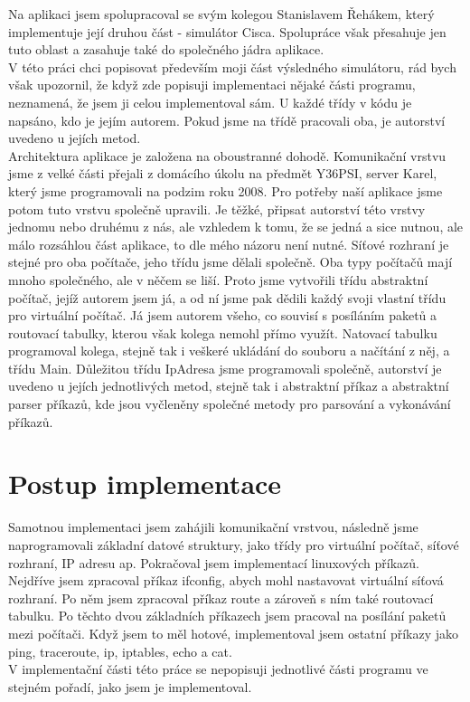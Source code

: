 Na aplikaci jsem spolupracoval se svým kolegou Stanislavem Řehákem, který implementuje její druhou část - simulátor Cisca. Spolupráce však přesahuje jen tuto oblast a zasahuje také do společného jádra aplikace.\\
V této práci chci popisovat především moji část výsledného simulátoru, rád bych však upozornil, že když zde popisuji implementaci nějaké části programu, neznamená, že jsem ji celou implementoval sám. U každé třídy v kódu je napsáno, kdo je jejím autorem. Pokud jsme na třídě pracovali oba, je autorství uvedeno u jejích metod.\\
Architektura aplikace je založena na oboustranné dohodě.  Komunikační vrstvu jsme z velké části přejali z domácího úkolu na předmět Y36PSI, server Karel, který jsme programovali na podzim roku 2008. Pro potřeby naší aplikace jsme potom tuto vrstvu společně upravili. Je těžké, připsat autorství této vrstvy jednomu nebo druhému z nás, ale vzhledem k tomu, že se jedná a sice nutnou, ale málo rozsáhlou část aplikace, to dle mého názoru není nutné. Síťové rozhraní je stejné pro oba počítače, jeho třídu jsme dělali společně. Oba typy počítačů mají mnoho společného, ale v něčem se liší. Proto jsme vytvořili třídu abstraktní počítač, jejíž autorem jsem já, a od ní jsme pak dědili každý svoji vlastní třídu pro virtuální počítač. Já jsem autorem všeho, co souvisí s posíláním paketů a routovací tabulky, kterou však kolega nemohl přímo využít. Natovací tabulku programoval kolega, stejně tak i veškeré ukládání do souboru a načítání z něj, a třídu Main. Důležitou třídu IpAdresa jsme programovali společně, autorství je uvedeno u jejích jednotlivých metod, stejně tak i abstraktní příkaz a abstraktní parser příkazů, kde jsou vyčleněny společné metody pro parsování a vykonávání příkazů.


\section{Postup implementace}

Samotnou implementaci jsem zahájili komunikační vrstvou, následně jsme naprogramovali základní datové struktury, jako třídy pro virtuální počítač, síťové rozhraní, IP adresu ap. Pokračoval jsem implementací linuxových příkazů. Nejdříve jsem zpracoval příkaz ifconfig, abych mohl nastavovat virtuální síťová rozhraní. Po něm jsem zpracoval příkaz route a zároveň s ním také routovací tabulku. Po těchto dvou základních příkazech jsem pracoval na posílání paketů mezi počítači. Když jsem to měl hotové, implementoval jsem ostatní příkazy jako ping, traceroute, ip, iptables, echo a cat.\\
V implementační části této práce se nepopisuji jednotlivé části programu ve stejném pořadí, jako jsem je implementoval.




